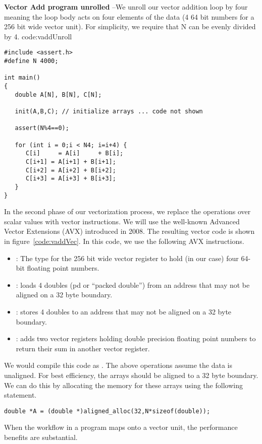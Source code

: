\begin{CodeExample}%
{\textbf{Vector Add program unrolled} --\small We unroll our vector addition loop by four meaning
the loop body acts on four elements of the data (4 64 bit numbers for a 256 bit wide vector unit).   For 
simplicity, we require that N can be evenly divided by 4.
}%
{code:vaddUnroll}
\begin{lstlisting}
#include <assert.h>
#define N 4000;

int main()
{
   double A[N], B[N], C[N];
   
   init(A,B,C); // initialize arrays ... code not shown
   
   assert(N%4==0);

   for (int i = 0;i < N4; i=i+4) {
      C[i]     = A[i]     + B[i];
      C[i+1] = A[i+1] + B[i+1];
      C[i+2] = A[i+2] + B[i+2];
      C[i+3] = A[i+3] + B[i+3];   
   }
}	  
\end{lstlisting}
\end{CodeExample}

In the second phase of our vectorization process, we replace the operations over scalar values with vector instructions.
We will use the well-known Advanced Vector Extensions (AVX) introduced in 2008. The resulting vector code is
shown in figure~\ref{code:vaddVec}.  In this code, we use the following AVX instructions.  
\begin{itemize}
\item {}: The type for the 256 bit wide vector register to hold (in our case) four 64-bit floating point numbers.
\item {}:  loads 4 doubles (pd or ``packed double'') from an address that may not be aligned on a 32 byte boundary.
\item {}:  stores 4 doubles to an address that may not be aligned on a 32 byte boundary.
\item {}: adds  two vector registers holding double precision floating point numbers to return 
their sum in another vector register.
\end{itemize}
We would compile this code as .  The above operations assume the data is unaligned.  
For best efficiency, the arrays  should be 
aligned to a 32 byte boundary.  We can do this by allocating the memory for these arrays using the following statement.
\begin{verbatim}
double *A = (double *)aligned_alloc(32,N*sizeof(double));
\end{verbatim}
When the workflow in a program maps onto a vector unit, the performance 
benefits are substantial.

